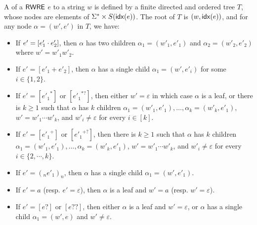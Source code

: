   \begin{definition}
  	A  of a ${\sf RWRE}$ $e$ to a string $w$ is defined by a finite directed and ordered
  	tree $T$, whose nodes are elements of $\Sigma^{\ast} \times S ({\sf idx}(e))$. %
  	The  root of $T$ is $(w, {\sf idx}(e))$, and for any node $\alpha =  	(w', e')$ in $T$, we have:
  	\begin{itemize}
  		\item If $e' = [e'_1 \cdot e'_2]$, then $\alpha$ has two children $\alpha_1 = (w'_1,
  		e'_1)$ and $\alpha_2=(w'_2, e'_2)$ where $w' = w'_1 w'_2$.
  		
  		\item If $e' = [e'_1 + e'_2]$, then $\alpha$ has a single child $\alpha_1 = (w',
  		e'_i)$ for some $i \in \{ 1, 2 \}$.
  		
  		\item If $e' = [{e'_1}^{\ast}]$ or $[{e'_1}^{\ast ?}]$, then either $w' = \varepsilon$ in which case $\alpha$ is a
  		leaf, or there is $k \geqslant 1$ such that $\alpha$ has $k$ children $\alpha_1 = (w'_1,
  		e'_1), \ldots, \alpha_k = (w'_k, e'_1)$, $w' = w'_1 \cdots w'_k$, and $w'_i \neq \varepsilon$ for every $i \in [k]$.

  		\item If $e' = [{e'_1}^{+}]$ or $[{e'_1}^{+ ?}]$, then there is $k \geqslant 1$ such that $\alpha$ has $k$ children $\alpha_1 = (w'_1, e'_1), \ldots, \alpha_k = (w'_k, e'_1)$, $w' = w'_1 \cdots w'_k$, and $w'_i \neq \varepsilon$ for every $i \in \{2, \cdots, k\}$.
%
%		
  		\item If $e' = (_n e'_1)_n$, then $\alpha$ has a single child $\alpha_1 = (w', e'_1)$.
  		\item If $e' = a$ (resp. $e' = \varepsilon$), then $\alpha$ is a leaf and
  		$w' = a$ (resp. $w' = \varepsilon$).
%		
  		\item If $e' = [e?]$ or $[e??]$, then either $\alpha$ is a leaf and
  		$w' = \varepsilon$, or $\alpha$ has a single child $\alpha_1 = (w', e)$ and $w' \neq \varepsilon$.
  		

\end{itemize}
\end{definition}
